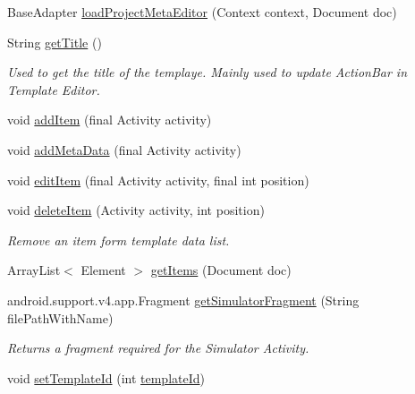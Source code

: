 \begin{DoxyCompactItemize}
\item 
Base\+Adapter \hyperlink{classorg_1_1buildmlearn_1_1toolkit_1_1templates_1_1MatchTemplate_a345c6be4d5b58a1510612d5425cc96ca}{load\+Project\+Meta\+Editor} (Context context, Document doc)
\item 
String \hyperlink{classorg_1_1buildmlearn_1_1toolkit_1_1templates_1_1MatchTemplate_a3e949eacb6915a89d28d7697e7dce5f3}{get\+Title} ()
\begin{DoxyCompactList}\small\item\em Used to get the title of the templaye. Mainly used to update Action\+Bar in Template Editor. \end{DoxyCompactList}\item 
void \hyperlink{classorg_1_1buildmlearn_1_1toolkit_1_1templates_1_1MatchTemplate_aec3143cb3432f1bc9fbab13ad69d2faa}{add\+Item} (final Activity activity)
\item 
void \hyperlink{classorg_1_1buildmlearn_1_1toolkit_1_1templates_1_1MatchTemplate_ab9dec7926d533518b189720728187891}{add\+Meta\+Data} (final Activity activity)
\item 
void \hyperlink{classorg_1_1buildmlearn_1_1toolkit_1_1templates_1_1MatchTemplate_af54e14873c56d5b4bb07968ec319116e}{edit\+Item} (final Activity activity, final int position)
\item 
void \hyperlink{classorg_1_1buildmlearn_1_1toolkit_1_1templates_1_1MatchTemplate_a319114cb88507d06613c769ff23b6b64}{delete\+Item} (Activity activity, int position)
\begin{DoxyCompactList}\small\item\em Remove an item form template data list. \end{DoxyCompactList}\item 
Array\+List$<$ Element $>$ \hyperlink{classorg_1_1buildmlearn_1_1toolkit_1_1templates_1_1MatchTemplate_a69028a5091ceb5ee4777a0b1dc5c7308}{get\+Items} (Document doc)
\item 
android.\+support.\+v4.\+app.\+Fragment \hyperlink{classorg_1_1buildmlearn_1_1toolkit_1_1templates_1_1MatchTemplate_a74e18e384af5b0022bc19cf6ac341d4c}{get\+Simulator\+Fragment} (String file\+Path\+With\+Name)
\begin{DoxyCompactList}\small\item\em Returns a fragment required for the Simulator Activity. \end{DoxyCompactList}\item 
void \hyperlink{classorg_1_1buildmlearn_1_1toolkit_1_1templates_1_1MatchTemplate_a4a85b3025db0c0f1f445818f47d914be}{set\+Template\+Id} (int \hyperlink{classorg_1_1buildmlearn_1_1toolkit_1_1templates_1_1MatchTemplate_a2e7eea6a94cc7e7c08e4db7dc31d4a7c}{template\+Id})

\end{DoxyCompactItemize}
